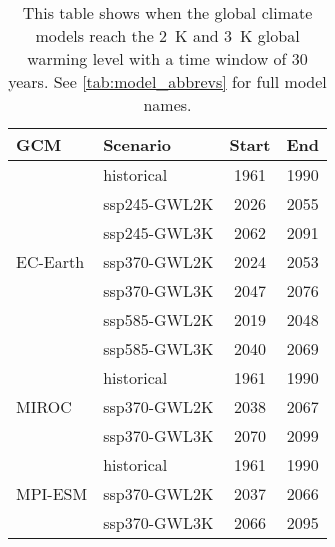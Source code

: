 \begin{table}[!htbp]
\centering
\footnotesize
\caption{This table shows when the global climate models reach the \qty{2}{\kelvin} and \qty{3}{\kelvin} global warming level with a time window of 30 years. See \autoref{tab:model_abbrevs} for full model names.}
\label{Table:GWL}
\begin{tabular}{l|l|c|c|}
\toprule
GCM & Scenario & Start & End \\
\midrule
\multirow{7}{*}{EC-Earth} & historical & 1961 & 1990\\
 &  ssp245-GWL2K & 2026 & 2055\\
 &  ssp245-GWL3K & 2062 & 2091\\
 &  ssp370-GWL2K & 2024 & 2053\\
 &  ssp370-GWL3K & 2047 & 2076\\
 &  ssp585-GWL2K & 2019 & 2048\\
 &  ssp585-GWL3K & 2040 & 2069\\
\cmidrule(lr){1-4}
\multirow{3}{*}{MIROC} & historical & 1961 & 1990\\
 &  ssp370-GWL2K & 2038 & 2067\\
 &  ssp370-GWL3K & 2070 & 2099\\
\cmidrule(lr){1-4}
\multirow{3}{*}{MPI-ESM} & historical & 1961 & 1990\\
 &  ssp370-GWL2K & 2037 & 2066\\
 &  ssp370-GWL3K & 2066 & 2095\\
\bottomrule
\end{tabular}
\end{table}
